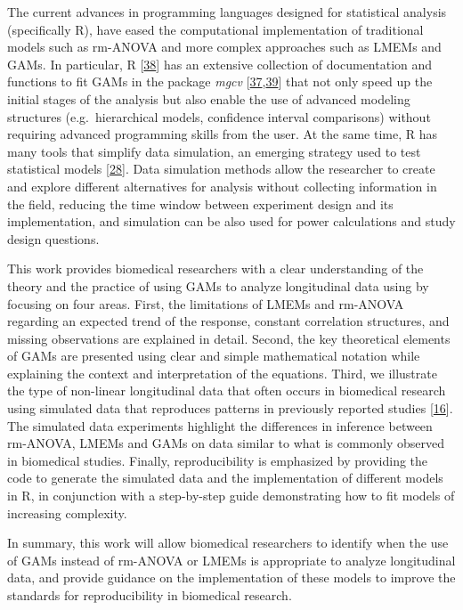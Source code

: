 \documentclass[
]{article}
\begin{document}
The current advances in programming languages designed for statistical analysis (specifically R), have eased the computational implementation of traditional models such as rm-ANOVA and more complex approaches such as LMEMs and GAMs. In particular, R {[}\protect\hyperlink{ref-r}{38}{]} has an extensive collection of documentation and functions to fit GAMs in the package \emph{mgcv} {[}\protect\hyperlink{ref-wood2017}{37},\protect\hyperlink{ref-wood2016}{39}{]} that not only speed up the initial stages of the analysis but also enable the use of advanced modeling structures (e.g.~hierarchical models, confidence interval comparisons) without requiring advanced programming skills from the user. At the same time, R has many tools that simplify data simulation, an emerging strategy used to test statistical models {[}\protect\hyperlink{ref-haverkamp2017}{28}{]}. Data simulation methods allow the researcher to create and explore different alternatives for analysis without collecting information in the field, reducing the time window between experiment design and its implementation, and simulation can be also used for power calculations and study design questions.

This work provides biomedical researchers with a clear understanding of the theory and the practice of using GAMs to analyze longitudinal data using by focusing on four areas. First, the limitations of LMEMs and rm-ANOVA regarding an expected trend of the response, constant correlation structures, and missing observations are explained in detail. Second, the key theoretical elements of GAMs are presented using clear and simple mathematical notation while explaining the context and interpretation of the equations. Third, we illustrate the type of non-linear longitudinal data that often occurs in biomedical research using simulated data that reproduces patterns in previously reported studies {[}\protect\hyperlink{ref-vishwanath2009}{16}{]}. The simulated data experiments highlight the differences in inference between rm-ANOVA, LMEMs and GAMs on data similar to what is commonly observed in biomedical studies. Finally, reproducibility is emphasized by providing the code to generate the simulated data and the implementation of different models in R, in conjunction with a step-by-step guide demonstrating how to fit models of increasing complexity.

In summary, this work will allow biomedical researchers to identify when the use of GAMs instead of rm-ANOVA or LMEMs is appropriate to analyze longitudinal data, and provide guidance on the implementation of these models to improve the standards for reproducibility in biomedical research.
\end{document}
